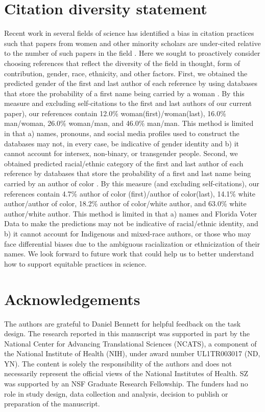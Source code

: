 \documentclass[a4paper,12pt]{article}
\begin{document}
\begin{refsection}[main]
\section*{Citation diversity statement}

Recent work in several fields of science has identified a bias in citation practices such that papers from women and other minority scholars are under-cited relative to the number of such papers in the field \cite{dworkin2020extent, bertolero2020racial}. Here we sought to proactively consider choosing references that reflect the diversity of the field in thought, form of contribution, gender, race, ethnicity, and other factors. First, we obtained the predicted gender of the first and last author of each reference by using databases that store the probability of a first name being carried by a woman \cite{dworkin2020extent}. By this measure and excluding self-citations to the first and last authors of our current paper), our references contain 12.0\% woman(first)/woman(last), 16.0\% man/woman, 26.0\% woman/man, and 46.0\% man/man. This method is limited in that a) names, pronouns, and social media profiles used to construct the databases may not, in every case, be indicative of gender identity and b) it cannot account for intersex, non-binary, or transgender people. Second, we obtained predicted racial/ethnic category of the first and last author of each reference by databases that store the probability of a first and last name being carried by an author of color \cite{ambekar2009name, sood2018predicting}. By this measure (and excluding self-citations), our references contain 4.7\% author of color (first)/author of color(last), 14.1\% white author/author of color, 18.2\% author of color/white author, and 63.0\% white author/white author. This method is limited in that a) names and Florida Voter Data to make the predictions may not be indicative of racial/ethnic identity, and b) it cannot account for Indigenous and mixed-race authors, or those who may face differential biases due to the ambiguous racialization or ethnicization of their names.  We look forward to future work that could help us to better understand how to support equitable practices in science.

\section*{Acknowledgements}

The authors are grateful to Daniel Bennett for helpful feedback on the task design. The research reported in this manuscript was supported in part by the National Center for Advancing Translational Sciences (NCATS), a component of the National Institute of Health (NIH), under award number UL1TR003017 (ND, YN). The content is solely the responsibility of the authors and does not necessarily represent the official views of the National Institutes of Health. SZ was supported by an NSF Graduate Research Fellowship. The funders had no role in study design, data collection and analysis, decision to publish or preparation of the manuscript.


\end{refsection}
\end{document}

